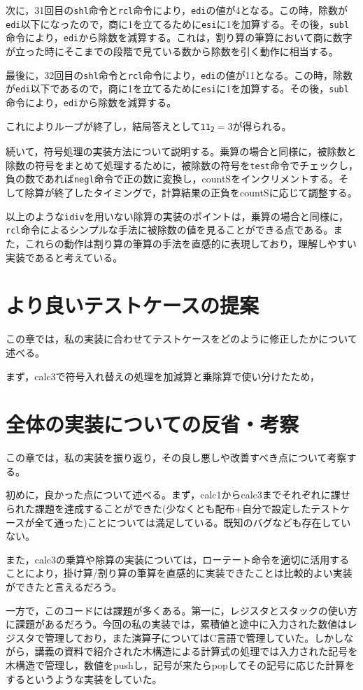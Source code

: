 \documentclass[a4paper]{jsarticle}
\newcommand{\var}[1]{\texttt{#1}}
\begin{document}
次に，31回目の\var{shl}命令と\var{rcl}命令により，\var{edi}の値が4となる。この時，除数が\var{edi}以下になったので，商に1を立てるために\var{esi}に1を加算する。その後，\var{subl}命令により，\var{edi}から除数を減算する。これは，割り算の筆算において商に数字が立った時にそこまでの段階で見ている数から除数を引く動作に相当する。

最後に，32回目の\var{shl}命令と\var{rcl}命令により，\var{edi}の値が11となる。この時，除数が\var{edi}以下であるので，商に1を立てるために\var{esi}に1を加算する。その後，\var{subl}命令により，\var{edi}から除数を減算する。

これによりループが終了し，結局答えとして\texttt{11\textsubscript{2}}$=3$が得られる。


続いて，符号処理の実装方法について説明する。乗算の場合と同様に，被除数と除数の符号をまとめて処理するために，被除数の符号を\var{test}命令でチェックし，負の数であれば\var{negl}命令で正の数に変換し，countSをインクリメントする。そして除算が終了したタイミングで，計算結果の正負をcountSに応じて調整する。

以上のような\var{idiv}を用いない除算の実装のポイントは，乗算の場合と同様に，\var{rcl}命令によるシンプルな手法に被除数の値を見ることができる点である。また，これらの動作は割り算の筆算の手法を直感的に表現しており，理解しやすい実装であると考えている。

\section{より良いテストケースの提案}
この章では，私の実装に合わせてテストケースをどのように修正したかについて述べる。

まず，calc3で符号入れ替えの処理を加減算と乗除算で使い分けたため，


\section{全体の実装についての反省・考察}
この章では，私の実装を振り返り，その良し悪しや改善すべき点について考察する。

初めに，良かった点について述べる。まず，calc1からcalc3までそれぞれに課せられた課題を達成することができた(少なくとも配布+自分で設定したテストケースが全て通った)ことについては満足している。既知のバグなども存在していない。

また，calc3の乗算や除算の実装については，ローテート命令を適切に活用することにより，掛け算/割り算の筆算を直感的に実装できたことは比較的よい実装ができたと言えるだろう。

一方で，このコードには課題が多くある。第一に，レジスタとスタックの使い方に課題があるだろう。今回の私の実装では，累積値と途中に入力された数値はレジスタで管理しており，また演算子についてはC言語で管理していた。しかしながら，講義の資料で紹介された木構造による計算式の処理では入力された記号を木構造で管理し，数値をpushし，記号が来たらpopしてその記号に応じた計算をするというような実装をしていた。
\end{document}

